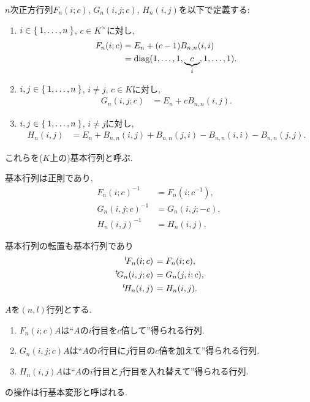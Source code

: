 \begin{definition}
  $n$次正方行列$F_n(i;c)$, $G_n(i,j;c)$, $H_n(i,j)$を以下で定義する:
  \begin{enumerate}
    \item $i\in\Set{1,\ldots,n}$, $c\in K^\times$に対し,
      \begin{align*}
        F_n(i;c)&=E_n+(c-1)B_{n,n}(i,i)\\
        &=\operatorname{diag}(1,\ldots,1,\underbrace{c}_{i},1,\ldots,1).
      \end{align*}
    \item $i,j\in\Set{1,\ldots,n}$, $i\neq j$, $c\in K$に対し,
      \begin{align*}
        G_n(i,j;c)&=E_n+cB_{n,n}(i,j).
      \end{align*}
    \item $i,j\in\Set{1,\ldots,n}$, $i\neq j$に対し,
      \begin{align*}
        H_n(i,j)&=E_n+B_{n,n}(i,j)+B_{n,n}(j,i)-B_{n,n}(i,i)-B_{n,n}(j,j).
      \end{align*}
  \end{enumerate}
  これらを($K$上の)基本行列と呼ぶ.
\end{definition}

\begin{prop}
  基本行列は正則であり,
  \begin{align*}
    F_n(i;c)^{-1}&=F_n(i;c^{-1}),\\
    G_n(i,j;c)^{-1}&=G_n(i,j;-c),\\
    H_n(i,j)^{-1}&=H_n(i,j).
  \end{align*}
\end{prop}

\begin{prop}
  基本行列の転置も基本行列であり
  \begin{align*}
    \left.^{t}\!F_n(i;c)\right.&=F_n(i;c),\\
    \left.^{t}\!G_n(i,j;c)\right.&=G_n(j,i;c),\\
    \left.^{t}\!H_n(i,j)\right.&=H_n(i,j).
  \end{align*}
\end{prop}

\begin{prop}
  \label{prop:rowtranformation}
  $A$を$(n,l)$行列とする.
  \begin{enumerate}
  \item $F_n(i;c)A$は``$A$の$i$行目を$c$倍して''得られる行列.
  \item  $G_n(i,j;c)A$は``$A$の$i$行目に$j$行目の$c$倍を加えて''得られる行列.
  \item $H_n(i,j)A$は``$A$の$i$行目と$j$行目を入れ替えて''得られる行列.
  \end{enumerate}
\end{prop}
\begin{remark}
  の操作は行基本変形と呼ばれる.
\end{remark}


